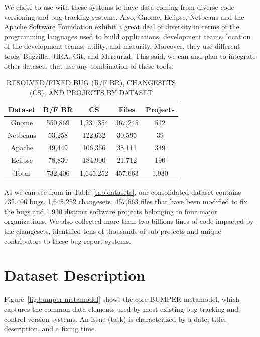 \documentclass{sig-alternate-05-2015}
\begin{document}
We chose to use with these systems to have data coming from
diverse code versioning and bug tracking systems.
Also, Gnome, Eclipse, Netbeans and the Apache Software Foundation exhibit a
great deal of diversity in terms of the programming
languages used to build applications, development teams,
location of the development teams, utility, and maturity.
Moreover, they use different tools, Bugzilla, JIRA, Git, and
Mercurial. This said, we can and plan to integrate other datasets that
use any combination of these tools.

\begin{table}[]
\centering
\caption{
RESOLVED/FIXED BUG (R/F BR),  CHANGESETS (CS), AND
PROJECTS BY DATASET \label{tab:datasets}}
\label{tab:summary}
\begin{tabular}{c|c|c|c|c}
\textbf{Dataset} & \textbf{R/F BR} & \textbf{CS} & \textbf{Files} & \textbf{Projects} \\ \hline \hline
Gnome            & 550,869         & 1,231,354   & 367,245        & 512                \\ \hline
Netbeans         & 53,258          & 122,632     & 30,595         & 39                \\ \hline
Apache           & 49,449          & 106,366     & 38,111         & 349               \\ \hline
Eclipse          & 78,830          & 184,900     & 21,712         & 190                \\ \hline \hline
Total            & 732,406         & 1,645,252   & 457,663        & 1,930               \\ \hline \hline
\end{tabular}
\end{table}

As we can see from in Table \ref{tab:datasets}, our consolidated dataset contains 732,406 bugs,
1,645,252 changesets, 457,663 files that have been modified to fix the bugs
and 1,930 distinct software projects belonging to four major organizations.
We also collected more than two billions lines of code impacted by the
changesets, identified tens of thousands of sub-projects and unique contributors
to these bug report systems.



\section{Dataset Description}
\label{sec:Dataset Description}

Figure~\ref{fig:bumper-metamodel}  shows the core BUMPER metamodel,
which captures the common data elements used by most existing
bug tracking and control version systems. An issue (task) is
characterized by a date, title, description, and a fixing time.
\end{document}
